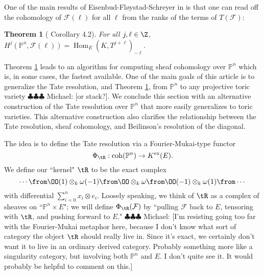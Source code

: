 \documentclass[12pt]{amsart}
\newtheorem{thm}[lemma]{Theorem}
\theoremstyle{definition}
\theoremstyle{remark}
\newcommand{\PP}{\mathbb P}
\newcommand{\Hom}{\operatorname{Hom}} %
\newcommand{\F}{\FF}
\newcommand{\michael}[1]{{\color{red} \sf $\clubsuit\clubsuit\clubsuit$ Michael: [#1]}}
\def\on{\operatorname}
\def\om{\omega}
\def\F{\mathcal{F}}
\def\om{\omega}
\def\l{\ell}
\begin{document}
One of the main results of Eisenbud-Fl\o ystad-Schreyer in \cite{EFS} is that one can read off the cohomology of $\F(\l)$ for all $\l$ from the ranks of the terms of $T(\F)$:

\begin{thm}[\cite{EFS} Corollary 4.2]
\label{EFS}
For all $j, \l \in \Z$, $H^j(\PP^n, \F(\l)) = \Hom_E(K, T^{j + \l})_{-\l}$.
\end{thm}
Theorem \ref{EFS} leads to an algorithm for computing sheaf cohomology over $\PP^n$ which is, in some cases, the fastest available. One of the main goals of this article is to generalize the Tate resolution, and Theorem \ref{EFS}, from $\PP^n$ to any projective toric variety \michael{or stack?}. We conclude this section with an alternative construction of the Tate resolution over $\PP^n$ that more easily generalizes to toric varieties. This alternative construction also clarifies the relationship between the Tate resolution, sheaf cohomology, and Beilinson's resolution of the diagonal. 

The idea is to define the Tate resolution via a Fourier-Mukai-type functor
$$
\Phi_{\tR}: \on{coh}(\PP^n) \to K^{\on{ex}}(E).
$$
We define our ``kernel" $\tR$ to be the exact complex 
$$
\cdots \from \OO(1) \otimes_k \om(-1) \from \OO \otimes_k \om \from \OO(-1) \otimes_k \om(1) \from \cdots
$$
with differential $\sum_{i = 0}^n x_i \otimes e_i$. Loosely speaking, we think of $\tR$ as a complex of sheaves on ``$\PP^n \times E$"; we will define $\Phi_{\tR}(\F)$ by ``pulling $\F$ back to $E$, tensoring with $\tR$, and pushing forward to $E$." \michael{I'm resisting going too far with the Fourier-Mukai metaphor here, because I don't know what sort of category the object $\tR$ should really live in. Since it's exact, we certainly don't want it to live in an ordinary derived category. Probably something more like a singularity category, but involving both $\PP^n$ and $E$. I don't quite see it. It would probably be helpful to comment on this.}
\end{document}

